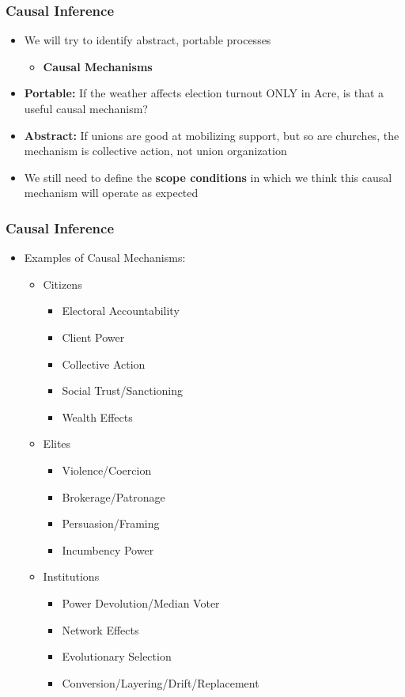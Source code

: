 \documentclass[xcolor=x11names,compress]{beamer}\usepackage[]{graphicx}\usepackage[]{color}
\renewcommand{\(}{\begin{columns}}
\renewcommand{\)}{\end{columns}}
\newcommand{\<}[1]{\begin{column}{#1}}
\renewcommand{\>}{\end{column}}
\begin{document}
\begin{frame}
\frametitle{Causal Inference}
\begin{itemize}
\item We will try to identify abstract, portable processes
\begin{itemize}
\item \textbf{Causal Mechanisms}
\end{itemize}
\item \textbf{Portable:} If the weather affects election turnout ONLY in Acre, is that a useful causal mechanism?
\item \textbf{Abstract:} If unions are good at mobilizing support, but so are churches, the mechanism is collective action, not union organization
\item We still need to define the \textbf{scope conditions} in which we think this causal mechanism will operate as expected
\end{itemize}
\end{frame}

\begin{frame}
\frametitle{Causal Inference}
\begin{itemize}
\item Examples of Causal Mechanisms:
\begin{itemize}
\item Citizens
\begin{itemize}
\item Electoral Accountability
\item Client Power
\item Collective Action
\item Social Trust/Sanctioning
\item Wealth Effects
\end{itemize}
\item Elites
\begin{itemize}
\item Violence/Coercion
\item Brokerage/Patronage
\item Persuasion/Framing
\item Incumbency Power
\end{itemize}
\item Institutions
\begin{itemize}
\item Power Devolution/Median Voter
\item Network Effects
\item Evolutionary Selection
\item Conversion/Layering/Drift/Replacement
\end{itemize}
\end{itemize}
\end{itemize}
\end{frame}
\end{document}
